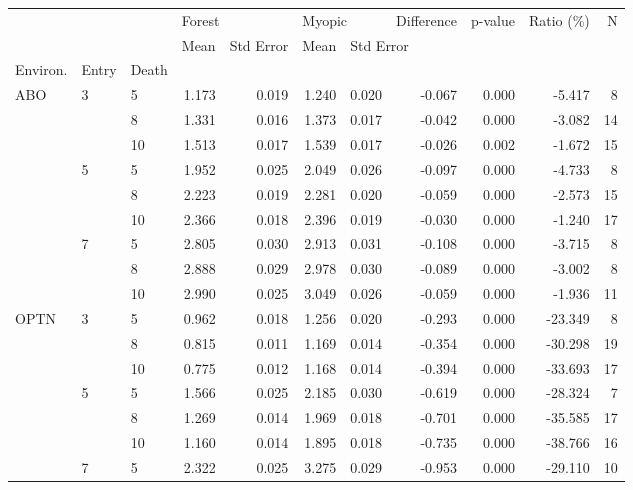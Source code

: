 \begin{tabular}{lllrrrrrrrr}
\toprule
    &   &    & \multicolumn{2}{l}{Forest} & \multicolumn{2}{l}{Myopic} & Difference & p-value & Ratio (\%) &   N \\
    &   &    &   Mean & Std Error &   Mean & \multicolumn{5}{l}{Std Error} \\
Environ. & Entry & Death &        &           &        &           &            &         &           &     \\
\midrule
ABO & 3 & 5  &  1.173 &     0.019 &  1.240 &     0.020 &     -0.067 &   0.000 &    -5.417 &   8 \\
    &   & 8  &  1.331 &     0.016 &  1.373 &     0.017 &     -0.042 &   0.000 &    -3.082 &  14 \\
    &   & 10 &  1.513 &     0.017 &  1.539 &     0.017 &     -0.026 &   0.002 &    -1.672 &  15 \\
    & 5 & 5  &  1.952 &     0.025 &  2.049 &     0.026 &     -0.097 &   0.000 &    -4.733 &   8 \\
    &   & 8  &  2.223 &     0.019 &  2.281 &     0.020 &     -0.059 &   0.000 &    -2.573 &  15 \\
    &   & 10 &  2.366 &     0.018 &  2.396 &     0.019 &     -0.030 &   0.000 &    -1.240 &  17 \\
    & 7 & 5  &  2.805 &     0.030 &  2.913 &     0.031 &     -0.108 &   0.000 &    -3.715 &   8 \\
    &   & 8  &  2.888 &     0.029 &  2.978 &     0.030 &     -0.089 &   0.000 &    -3.002 &   8 \\
    &   & 10 &  2.990 &     0.025 &  3.049 &     0.026 &     -0.059 &   0.000 &    -1.936 &  11 \\
OPTN & 3 & 5  &  0.962 &     0.018 &  1.256 &     0.020 &     -0.293 &   0.000 &   -23.349 &   8 \\
    &   & 8  &  0.815 &     0.011 &  1.169 &     0.014 &     -0.354 &   0.000 &   -30.298 &  19 \\
    &   & 10 &  0.775 &     0.012 &  1.168 &     0.014 &     -0.394 &   0.000 &   -33.693 &  17 \\
    & 5 & 5  &  1.566 &     0.025 &  2.185 &     0.030 &     -0.619 &   0.000 &   -28.324 &   7 \\
    &   & 8  &  1.269 &     0.014 &  1.969 &     0.018 &     -0.701 &   0.000 &   -35.585 &  17 \\
    &   & 10 &  1.160 &     0.014 &  1.895 &     0.018 &     -0.735 &   0.000 &   -38.766 &  16 \\
    & 7 & 5  &  2.322 &     0.025 &  3.275 &     0.029 &     -0.953 &   0.000 &   -29.110 &  10 \\

\end{tabular}
